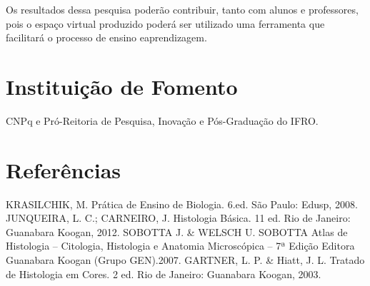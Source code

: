 \documentclass[article,12pt,onesidea,4paper,english,brazil]{abntex2}
\begin{document}
Os resultados dessa pesquisa poderão contribuir, tanto com alunos e professores, pois o espaço virtual produzido poderá ser utilizado uma ferramenta que facilitará o processo de ensino eaprendizagem.
	
	\section*{Instituição de Fomento}
	
	CNPq e Pró-Reitoria de Pesquisa, Inovação e Pós-Graduação do IFRO.
	
	\section*{Referências}
	
\noindent KRASILCHIK, M. Prática de Ensino de Biologia. 6.ed. São Paulo: Edusp, 2008. JUNQUEIRA, L. C.; CARNEIRO, J. Histologia Básica. 11 ed. Rio de Janeiro: Guanabara Koogan, 2012.
\noindent SOBOTTA J. \& WELSCH U. SOBOTTA Atlas de Histologia – Citologia, Histologia e Anatomia Microscópica – 7ª Edição Editora Guanabara Koogan (Grupo GEN).2007.
\noindent GARTNER, L. P. \& Hiatt, J. L. Tratado de Histologia em Cores. 2 ed. Rio de Janeiro: Guanabara Koogan, 2003.
	
\end{document}
